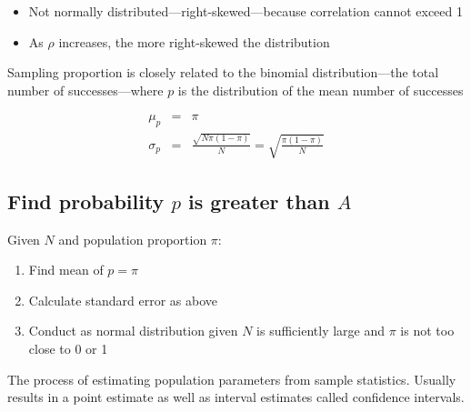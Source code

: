 \hformbar




\begin{itemize}
  \item Not normally distributed---right-skewed---because correlation cannot
	exceed 1
  \item As $\rho$ increases, the more right-skewed the distribution
\end{itemize}

\hformbar




Sampling proportion is closely related to the binomial distribution---the
total number of successes---where $p$ is the distribution of the mean number of
successes

\begin{eqnarray}
  \mu_p &=& \pi \\
  \sigma_p &=& \frac{\sqrt{N \pi (1 - \pi)}}{N}
           = \sqrt{\frac{\pi (1 - \pi)}{N}}
\end{eqnarray}

\subsection*{Find probability $p$ is greater than $A$}

Given $N$ and population proportion $\pi$:

\begin{enumerate}
  \item Find mean of $p = \pi$
  \item Calculate standard error as above
  \item Conduct as normal distribution given $N$ is sufficiently large and $\pi$
	is not too close to 0 or 1
\end{enumerate}

\hformbar




The process of estimating population parameters from sample statistics. Usually
results in a point estimate as well as interval estimates called confidence
intervals.

\hformbar






\hformbar




\newpage
